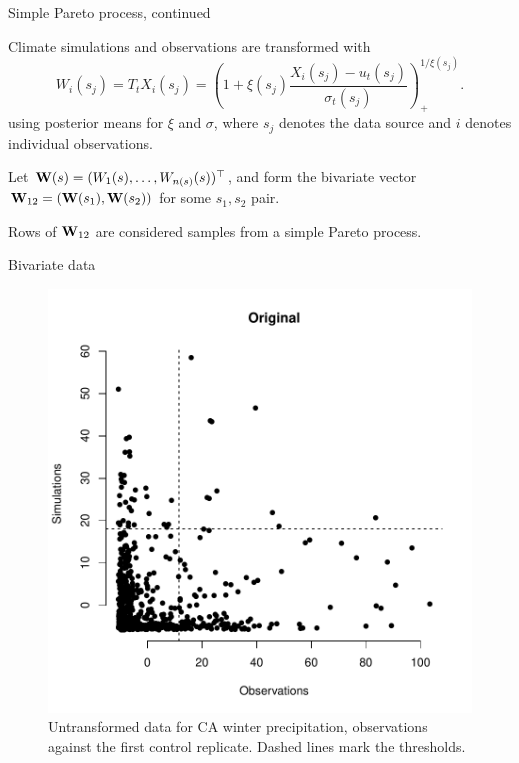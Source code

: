 \documentclass[mathserif, 11pt, t]{beamer}
\begin{document}
\begin{frame}{Simple Pareto process, continued}

Climate simulations and observations are transformed with
\[ W_i(s_j) = T_t X_i(s_j) = \left(1 + \xi(s_j)\frac{X_i(s_j) - u_t(s_j)}{\sigma_t(s_j)}\right)_+^{1/\xi(s_j)}. \]
using posterior means for $\xi$ and $\sigma$, where $s_j$ denotes the data source and $i$ denotes individual observations.
\bigskip

Let $\mathbf{\bm{W}}(s)=(W_1(s),\ldots, W_{n(s)}(s))^\top$, and form the bivariate vector $\mathbf{\bm{W}}_{12}=(\mathbf{\bm{W}}(s_1), \mathbf{\bm{W}}(s_2))$ for some $s_1,s_2$ pair.
\bigskip

Rows of $\mathbf{\bm{W}}_{12}$ are considered samples from a simple Pareto process.


\end{frame}

\begin{frame}{Bivariate data}
\begin{figure}
\begin{center}
\includegraphics[scale=0.34]{figs/biv_orig.pdf}
\end{center}
\caption{Untransformed data for CA winter precipitation, observations against the first control replicate. Dashed lines mark the thresholds.}
\end{figure}
\end{frame}
\end{document}
